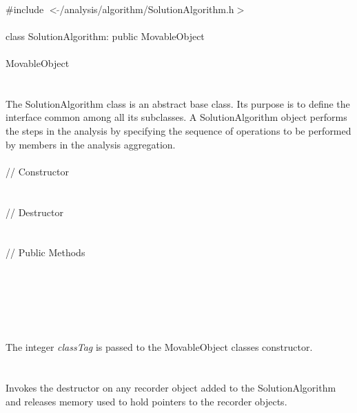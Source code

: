 
   \\
\indent \#include $<\tilde{ }$/analysis/algorithm/SolutionAlgorithm.h$>$  \\

  \\
\indent class SolutionAlgorithm: public MovableObject  \\

 \\
\indent MovableObject \\
\indent{} \\

 \\
\indent The SolutionAlgorithm class is an abstract base class. Its purpose
is to define the interface common among all its subclasses. A
SolutionAlgorithm object performs the steps in the analysis by specifying
the sequence of operations to be performed by members in the analysis
aggregation.\\


 \\
\indent // Constructor \\
\\  \\
\indent // Destructor \\
\\  \\
\indent // Public Methods  \\
 \\
\\
 \\
 \\


 \\
\\
The integer {\em classTag} is passed to the MovableObject classes
constructor. \\

 \\
\\
Invokes the destructor on any recorder object added to the
SolutionAlgorithm and releases memory used to hold pointers to the
recorder objects. \\


